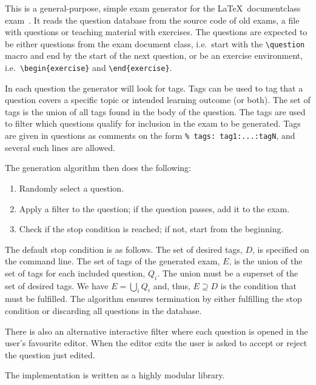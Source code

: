This is a general-purpose, simple exam generator for the \LaTeX\ documentclass 
exam~\cite{exam}.
It reads the question database from the source code of old exams, a file with 
questions or teaching material with exercises.
The questions are expected to be either questions from the exam document class, 
i.e.\ start with the
\verb'\question'
macro and end by the start of the next question, or be an exercise environment,
i.e.\ \verb'\begin{exercise}'
and
\verb'\end{exercise}'.

In each question the generator will look for tags.
Tags can be used to tag that a question covers a specific topic or intended 
learning outcome (or both).
The set of tags is the union of all tags found in the body of the question.
The tags are used to filter which questions qualify for inclusion in the exam 
to be generated.
Tags are given in questions as comments on the form
\verb'% tags: tag1:...:tagN',
and several such lines are allowed.

The generation algorithm then does the following:
\begin{enumerate}
\item Randomly select a question.
\item Apply a filter to the question; if the question passes, add it to the 
exam.
\item Check if the stop condition is reached; if not, start from the beginning.
\end{enumerate}
The default stop condition is as follows.
The set of desired tags, \(D\), is specified on the command line.
The set of tags of the generated exam, \(E\), is the union of the set of tags 
for each included question, \(Q_i\).
The union must be a superset of the set of desired tags.
We have \(E = \bigcup_i Q_i\) and, thus, \(E\supseteq D\) is the condition that 
must be fulfilled.
The algorithm ensures termination by either fulfilling the stop condition or 
discarding all questions in the database.

There is also an alternative interactive filter where each question is opened 
in the user's favourite editor.
When the editor exits the user is asked to accept or reject the question just 
edited.

The implementation is written as a highly modular library.
